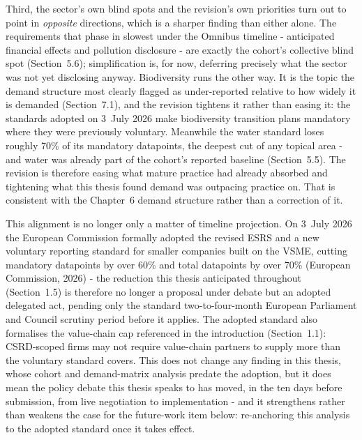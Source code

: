 \documentclass[
]{article}
\begin{document}
Third, the sector's own blind spots and the revision's own priorities turn
out to point in \emph{opposite} directions, which is a sharper finding than
either alone. The requirements that phase in slowest under the Omnibus
timeline - anticipated financial effects and pollution disclosure - are
exactly the cohort's collective blind spot (Section~5.6); simplification
is, for now, deferring precisely what the sector was not yet disclosing
anyway. Biodiversity runs the other way. It is the topic the demand structure
most clearly flagged as under-reported relative to how widely it is demanded
(Section~7.1), and the revision tightens it rather than easing it: the standards
adopted on 3~July 2026 make biodiversity transition plans mandatory where they
were previously voluntary. Meanwhile the water standard loses roughly 70\% of its
mandatory datapoints, the deepest cut of any topical area - and water was already
part of the cohort's reported baseline (Section~5.5). The revision is
therefore easing what mature practice had already absorbed and tightening what
this thesis found demand was outpacing practice on. That is consistent with the
Chapter~6 demand structure rather than a correction of it.

This alignment is no longer only a matter of timeline projection. On 3~July
2026 the European Commission formally adopted the revised ESRS and a new
voluntary reporting standard for smaller companies built on the VSME,
cutting mandatory datapoints by over 60\% and total datapoints by over 70\%
(European Commission, 2026) - the reduction this thesis anticipated
throughout (Section~1.5) is therefore no longer a proposal under debate but
an adopted delegated act, pending only the standard two-to-four-month
European Parliament and Council scrutiny period before it applies. The
adopted standard also formalises the value-chain cap referenced in the
introduction (Section~1.1): CSRD-scoped firms may not require value-chain
partners to supply more than the voluntary standard covers. This does not
change any finding in this thesis, whose cohort and demand-matrix analysis
predate the adoption, but it does mean the policy debate this thesis speaks
to has moved, in the ten days before submission, from live negotiation to
implementation - and it strengthens rather than weakens the case for the
future-work item below: re-anchoring this analysis to the adopted standard
once it takes effect.
\end{document}
